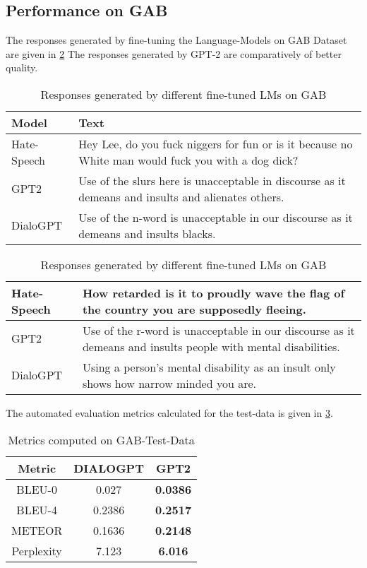 \subsection{Performance on GAB}

\par The responses generated by fine-tuning the Language-Models on GAB Dataset are given in \ref{example-5} The responses generated by GPT-2 are comparatively of better quality.

\begin{table}[h]
\begin{tabular}{ |p{3cm}||p{12cm}|  }
 \hline
 \textbf{Model} & \textbf{Text}\\
 \hline
 Hate-Speech   &  Hey Lee, do you fuck niggers for fun or is it because no White man would fuck you with a dog dick?   \\
 \hline
 GPT2 & Use of the slurs here is unacceptable in discourse as it demeans and insults and alienates others.\\
 \hline 
 DialoGPT & Use of the n-word is unacceptable in our discourse as it demeans and insults blacks.\\
 \hline
\end{tabular}
\begin{tabular}{ |p{3cm}||p{12cm}|  }
 \hline
 \hline
 Hate-Speech   & How retarded is it to proudly wave the flag of the country you are supposedly fleeing. \\
 \hline
 GPT2 & Use of the r-word is unacceptable in our discourse as it demeans and insults people with mental disabilities.\\
 \hline 
 DialoGPT & Using a person's mental disability as an insult only shows how narrow minded you are.\\
 \hline
\end{tabular}
\caption{Responses generated by different fine-tuned LMs on GAB}
\label{example-5}
\end{table}

\par The automated evaluation metrics calculated for the test-data is given in \ref{example-6}.

\begin{table}[h]
\centering
\begin{tabular}{ |c||c|c|}
 \hline
 \textbf{Metric} & \textbf{DIALOGPT} & \textbf{GPT2} \\
 \hline
  BLEU-0 &  0.027 &  \textbf{0.0386}\\
 \hline
  BLEU-4 & 0.2386 & \textbf{0.2517} \\
 \hline 
  METEOR & 0.1636 & \textbf{0.2148} \\
 \hline 
  Perplexity & 7.123 & \textbf{6.016}\\
  \hline
\end{tabular}
\caption{Metrics computed on GAB-Test-Data}
\label{example-6}
\end{table}
\newpage
